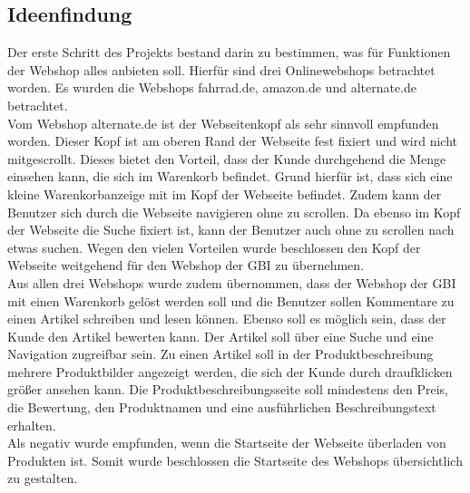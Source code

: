 \subsection{Ideenfindung}
Der erste Schritt des Projekts bestand darin zu bestimmen, was für Funktionen der Webshop alles anbieten soll. Hierfür sind drei Onlinewebshops betrachtet worden. Es wurden die Webshops \glqq fahrrad.de\grqq{}, \glqq amazon.de\grqq{} und \glqq alternate.de\grqq{} betrachtet.\\
Vom Webshop \glqq alternate.de\grqq{} ist der Webseitenkopf als sehr sinnvoll empfunden worden. Dieser Kopf ist am oberen Rand der Webseite fest fixiert und wird nicht mitgescrollt. Dieses bietet den Vorteil, dass der Kunde durchgehend die Menge einsehen kann, die sich im Warenkorb befindet. Grund hierfür ist, dass sich eine kleine Warenkorbanzeige mit im Kopf der Webseite befindet. Zudem kann der Benutzer sich durch die Webseite navigieren ohne zu scrollen. Da ebenso im Kopf der Webseite die Suche fixiert ist, kann der Benutzer auch ohne zu scrollen nach etwas suchen. Wegen den vielen Vorteilen wurde beschlossen den Kopf der Webseite weitgehend für den Webshop der GBI zu übernehmen.\\
Aus allen drei Webshops wurde zudem übernommen, dass der Webshop der GBI mit einen Warenkorb gelöst werden soll und die Benutzer sollen Kommentare zu einen Artikel schreiben und lesen können. Ebenso soll es möglich sein, dass der Kunde den Artikel bewerten kann. Der Artikel soll über eine Suche und eine Navigation zugreifbar sein. Zu einen Artikel soll in der Produktbeschreibung mehrere Produktbilder angezeigt werden, die sich der Kunde durch draufklicken größer ansehen kann. Die Produktbeschreibungsseite soll mindestens den Preis, die Bewertung, den Produktnamen und eine ausführlichen Beschreibungstext erhalten.\\
Als negativ wurde empfunden, wenn die Startseite der Webseite \glqq überladen\grqq{} von Produkten ist. Somit wurde beschlossen die Startseite des Webshops übersichtlich zu gestalten.

\newpage
